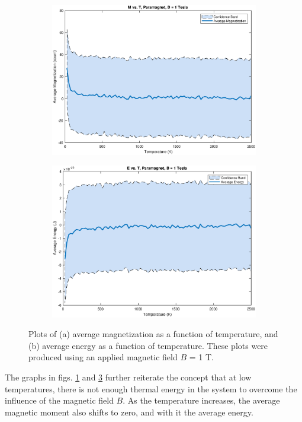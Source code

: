 \documentclass[12pt]{article}
\begin{document}
\begin{figure}[!h]
\begin{subfigure}{0.5\textwidth}
\includegraphics[width=\linewidth]{./Paragraphs/paraMvsT.eps}
\caption{\label{paraMvsT}}
\end{subfigure}
\begin{subfigure}{0.5\textwidth}
\includegraphics[width=\linewidth]{./Paragraphs/paraEvsT.eps}
\caption{\label{paraEvsT}}
\end{subfigure}
\caption{Plots of (a) average magnetization as a function of temperature, and (b) average energy as a function of temperature.  These plots were produced using an applied magnetic field $B$ = 1 T.} 
\end{figure} 
The graphs in figs. \ref{paraMvsT} and \ref{paraEvsT} further reiterate the concept that at low temperatures, there is not enough thermal energy in the system to overcome the influence of the magnetic field $B$.  As the temperature increases, the average magnetic moment also shifts to zero, and with it the average energy.
\end{document}
